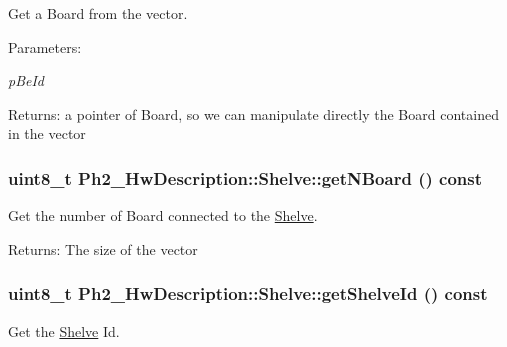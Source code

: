 Get a Board from the vector. 

\begin{Desc}
\item[Parameters:]
\begin{description}
\item[{\em p\-Be\-Id}]\end{description}
\end{Desc}
\begin{Desc}
\item[Returns:]a pointer of Board, so we can manipulate directly the Board contained in the vector \end{Desc}
\hypertarget{class_ph2___hw_description_1_1_shelve_15704e6b1f85ba4226b1f683707076ce}{
\subsubsection[getNBoard]{\setlength{\rightskip}{0pt plus 5cm}uint8\_\-t Ph2\_\-Hw\-Description::Shelve::get\-NBoard () const}}
\label{class_ph2___hw_description_1_1_shelve_15704e6b1f85ba4226b1f683707076ce}


Get the number of Board connected to the \hyperlink{class_ph2___hw_description_1_1_shelve}{Shelve}. 

\begin{Desc}
\item[Returns:]The size of the vector \end{Desc}
\hypertarget{class_ph2___hw_description_1_1_shelve_9d0d02ade3ff659d44728266d09d63da}{
\subsubsection[getShelveId]{\setlength{\rightskip}{0pt plus 5cm}uint8\_\-t Ph2\_\-Hw\-Description::Shelve::get\-Shelve\-Id () const}}
\label{class_ph2___hw_description_1_1_shelve_9d0d02ade3ff659d44728266d09d63da}


Get the \hyperlink{class_ph2___hw_description_1_1_shelve}{Shelve} Id. 

